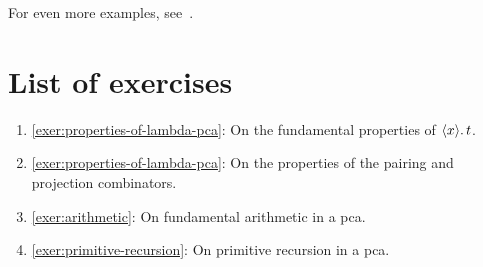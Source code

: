 For even more examples, see~\cite[Section~1.4]{vanOosten2008}.

\section{List of exercises}
\begin{enumerate}
\item \cref{exer:properties-of-lambda-pca}: On the fundamental properties of
  \(\langle{{x}}\rangle.\,{t}\).
\item \cref{exer:properties-of-lambda-pca}: On the properties of the pairing and
  projection combinators.
\item \cref{exer:arithmetic}: On fundamental arithmetic in a pca.
\item \cref{exer:primitive-recursion}: On primitive recursion in a pca.
\end{enumerate}




